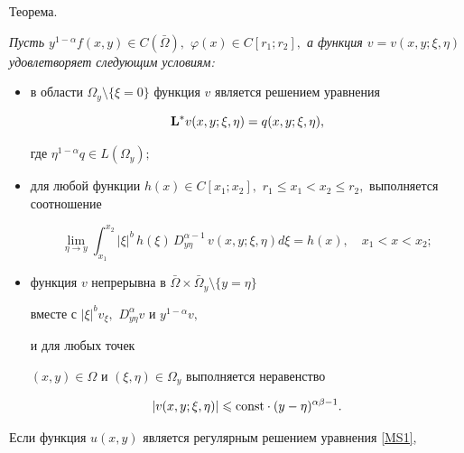 {\small \sc Теорема.} {\it Пусть $y^{1-\alpha}f(x,y)\in C(\bar{\Omega}),$ $\varphi(x)\in C[r_1;r_2],$ а функция $v=v(x,y;\xi,\eta)$ удовлетворяет следующим условиям\/{\rm:}



\begin{itemize}

\item[$1)$] 

в области $\Omega_y\setminus\{\xi=0\}$ функция $v$ является решением уравнения

\begin{equation}\label{Sopryazh_q}

{\bf L}^{*}v(x,y;\xi,\eta) =q(x,y;\xi,\eta),

\end{equation}

где $\eta^{1-\alpha}q\in L(\Omega_y);$



\item[$2)$]  для любой функции $h(x)\in C[x_1;x_2],$ $r_1\leqslant x_1<x_2 \leqslant r_2,$ выполняется соотношение

\begin{equation}\label{SvoystvoOfv}

\lim_{\eta \to y} \int _{x_1}^{x_2}

|\xi|^{b}\,h(\xi)\,D^{\alpha-1}_{y\eta}\,v(x,y;\xi,\eta) d\xi=h(x), \quad x_1 < x < x_2;

\end{equation}



\item[$3)$] функция $v$  непрерывна в $\bar{\Omega}\times\bar{\Omega}_y 

\setminus \{y=\eta\}$ 

вместе с  $|\xi|^b v_{\xi},$ $D_{y\eta}^{\alpha}v$ и $y^{1-\alpha}v,$

и для любых точек 

$(x,y) \in \Omega$ и $(\xi,\eta) \in \Omega_y$ выполняется неравенство

$$

|v(x,y;\xi,\eta)|\leqslant \text{\rm const} \cdot (y-\eta)^{\alpha\beta-1}.

$$



\end{itemize}



Если функция $u(x,y)$ является регулярным решением уравнения \eqref{MS1},

}
